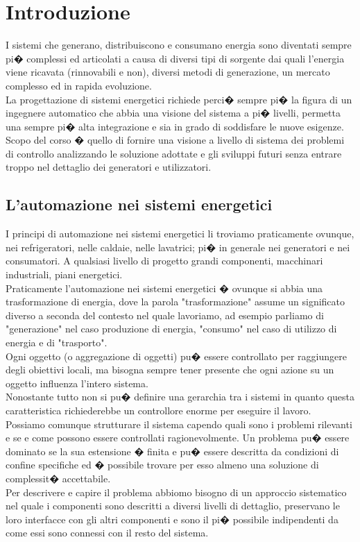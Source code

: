 \label{capitolo1}
\section{Introduzione}I sistemi che generano, distribuiscono e consumano energia sono diventati sempre pi� complessi ed articolati a causa di diversi tipi di sorgente dai quali l'energia viene ricavata (rinnovabili e non), diversi metodi di generazione, un mercato complesso ed in rapida evoluzione.\\
La progettazione di sistemi energetici richiede perci� sempre pi� la figura di un ingegnere automatico che abbia una visione del sistema a pi� livelli, permetta una sempre pi� alta integrazione e sia in grado di soddisfare le nuove esigenze.\\
Scopo del corso � quello di fornire una visione a livello di sistema dei problemi di controllo analizzando le soluzione adottate e gli sviluppi futuri senza entrare troppo nel dettaglio dei generatori e utilizzatori.
\subsection{L'automazione nei sistemi energetici}
I principi di automazione nei sistemi energetici li troviamo praticamente ovunque, nei refrigeratori, nelle caldaie, nelle lavatrici; pi� in generale nei generatori e nei consumatori.
A qualsiasi livello di progetto grandi componenti, macchinari industriali, piani energetici.\\
Praticamente l'automazione nei sistemi energetici � ovunque si abbia una trasformazione di energia, dove la parola "trasformazione" assume un significato diverso a seconda del contesto nel quale lavoriamo, ad esempio parliamo di "generazione" nel caso produzione di energia, "consumo" nel caso di utilizzo di energia e di "trasporto".\\
Ogni oggetto (o aggregazione di oggetti) pu� essere controllato per raggiungere degli obiettivi locali, ma bisogna sempre tener presente che ogni azione su un oggetto influenza l'intero sistema.\\
Nonostante tutto non si pu� definire una gerarchia tra i sistemi in quanto questa caratteristica richiederebbe un controllore enorme per eseguire il lavoro.\\
Possiamo comunque strutturare il sistema capendo quali sono i problemi rilevanti e se e come possono essere controllati ragionevolmente.
Un problema pu� essere dominato se la sua estensione � finita e pu� essere descritta da condizioni di confine specifiche ed � possibile trovare per esso almeno una soluzione di complessit� accettabile.\\
Per descrivere e capire il problema abbiomo bisogno di un approccio sistematico nel quale i componenti sono descritti a diversi livelli di dettaglio, preservano le loro interfacce con gli altri componenti e sono il pi� possibile indipendenti da come essi sono connessi con il resto del sistema.
